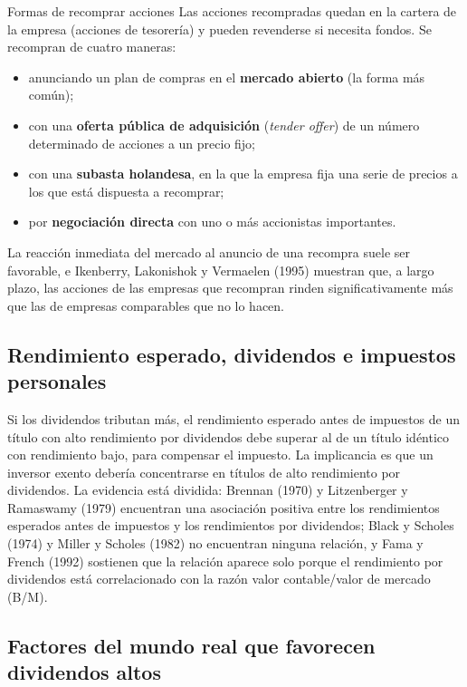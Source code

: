 \begin{definicion}{Formas de recomprar acciones}
Las acciones recompradas quedan en la cartera de la empresa (acciones de tesorería) y pueden revenderse si necesita fondos. Se recompran de cuatro maneras:
\begin{itemize}
\item anunciando un plan de compras en el \textbf{mercado abierto} (la forma más común);
\item con una \textbf{oferta pública de adquisición} (\emph{tender offer}) de un número determinado de acciones a un precio fijo;
\item con una \textbf{subasta holandesa}, en la que la empresa fija una serie de precios a los que está dispuesta a recomprar;
\item por \textbf{negociación directa} con uno o más accionistas importantes.
\end{itemize}
\end{definicion}

La reacción inmediata del mercado al anuncio de una recompra suele ser favorable, e Ikenberry, Lakonishok y Vermaelen (1995) muestran que, a largo plazo, las acciones de las empresas que recompran rinden significativamente más que las de empresas comparables que no lo hacen.

\subsection{Rendimiento esperado, dividendos e impuestos personales}

Si los dividendos tributan más, el rendimiento esperado antes de impuestos de un título con alto rendimiento por dividendos debe superar al de un título idéntico con rendimiento bajo, para compensar el impuesto. La implicancia es que un inversor exento debería concentrarse en títulos de alto rendimiento por dividendos. La evidencia está dividida: Brennan (1970) y Litzenberger y Ramaswamy (1979) encuentran una asociación positiva entre los rendimientos esperados antes de impuestos y los rendimientos por dividendos; Black y Scholes (1974) y Miller y Scholes (1982) no encuentran ninguna relación, y Fama y French (1992) sostienen que la relación aparece solo porque el rendimiento por dividendos está correlacionado con la razón valor contable/valor de mercado (B/M).

\subsection{Factores del mundo real que favorecen dividendos altos}

